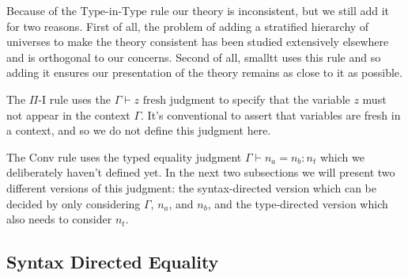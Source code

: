 \documentclass[sigplan]{acmart}
\newcommand{\univE}{\text{Type}}
\newcommand{\tyEqJ}[4]{#1 \vdash #2 = #3 : #4}
\newcommand{\freshJ}[2]{#1 \vdash #2 \text{ fresh}}
\begin{document}
Because of the $\univE$-in-$\univE$ rule our theory is inconsistent, but we still add it for two reasons.
First of all, the problem of adding a stratified hierarchy of universes to make the theory consistent has been studied extensively elsewhere and is orthogonal to our concerns.
Second of all, smalltt uses this rule and so adding it ensures our presentation of the theory remains as close to it as possible.

The $\Pi$-I rule uses the $\freshJ{\Gamma}{z}$ judgment to specify that the variable $z$ must not appear in the context $\Gamma$.
It's conventional to assert that variables are fresh in a context, and so we do not define this judgment here.

The Conv rule uses the typed equality judgment $\tyEqJ{\Gamma}{n_a}{n_b}{n_t}$ which we deliberately haven't defined yet.
In the next two subsections we will present two different versions of this judgment: the syntax-directed version which can be decided by only considering $\Gamma$, $n_a$, and $n_b$, and the type-directed version which also needs to consider $n_t$.

\subsection{Syntax Directed Equality}
\end{document}
